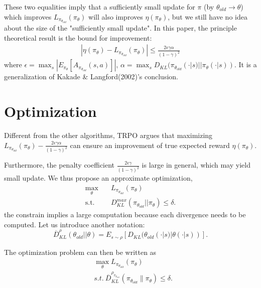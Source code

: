 These two equalities imply that a sufficiently small update for $\pi$ (by $\theta_{old}\rightarrow\theta$) which improves $L_{\pi_{\theta_{old}}}(\pi_{\theta})$ will also improves $\eta(\pi_{\theta})$, but we still have no idea about the size of the "sufficiently small update". In this paper, the principle theoretical result is the bound for improvement:
\begin{align*}
|\eta(\pi_{\theta})-L_{\pi_{\theta_{old}}}(\pi_{\theta})|\leq\frac{2\epsilon\gamma\alpha}{(1-\gamma)^{2}}
\end{align*}
where $\epsilon=\max_{s}|E_{\pi_{\theta}}[A_{\pi_{\theta_{old}}}(s,a)]|$, $\alpha=\max_{s} D_{KL}(\pi_{\theta_{old}}(\cdot|s)||\pi_{\theta}(\cdot|s))$.
It is a generalization of Kakade \& Langford(2002)'s conclusion.

\section{Optimization}
Different from the other algorithms, TRPO argues that maximizing $L_{\pi_{\theta_{old}}}(\pi_{\theta})-\frac{2\epsilon\gamma\alpha}{(1-\gamma)^{2}}$ can ensure an improvement of true expected reward $\eta(\pi_{\theta})$.

Furthermore, the penalty coefficient $\frac{2\epsilon\gamma}{(1-\gamma)^{2}}$ is large in general, which may yield small update. We thus propose an approximate optimization,
\begin{align*}
\max_{\theta} &\quad L_{\pi_{\theta_{old}}}(\pi_{\theta})\\
\text{s.t.} &\quad D_{KL}^{max}(\pi_{\theta_{old}}||\pi_{\theta})\leq\delta.
\end{align*}
the constrain implies a large computation because each divergence needs to be computed. Let us introduce another notation: $$ \overline{D}_{KL}^{\rho}(\theta_{old}||\theta)=E_{s\sim\rho}[D_{KL}(\theta_{old}(\cdot|s)|\theta(\cdot|s))].$$

The optimization problem can then be written as
\begin{align}
&\max_{\theta}L_{\pi_{\theta_{old}}}(\pi_{\theta})\\
&s.t.\ \overline{D}_{KL}^{\rho_{\pi_{\theta_{old}}}}(\pi_{\theta_{old}}\|\pi_{\theta})\leq\delta.
\end{align}
